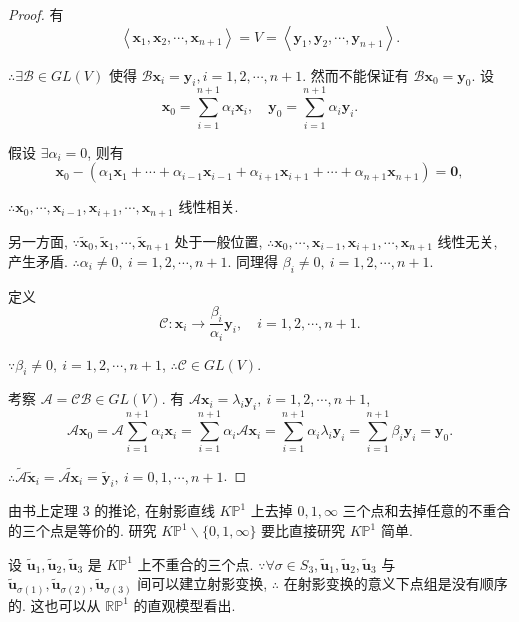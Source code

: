 \documentclass[color=black,device=normal,lang=cn,mode=geye]{elegantnote}
\begin{document}
\begin{proof}
    有
    \[\left<\boldsymbol{x}_1,\boldsymbol{x}_2,\cdots,\boldsymbol{x}_{n+1}\right>=V=\left<\boldsymbol{y}_1,\boldsymbol{y}_2,\cdots,\boldsymbol{y}_{n+1}\right>.\]

    $\therefore\exists\mathcal{B}\in GL (V)$ 使得 $\mathcal{B}\boldsymbol{x}_i=\boldsymbol{y}_i,i=1,2,\cdots,n+1$. 然而不能保证有 $\mathcal{B}\boldsymbol{x}_0=\boldsymbol{y}_0$. 设
    \[\boldsymbol{x}_0=\sum\limits_{i=1}^{n+1}\alpha_i\boldsymbol{x}_i,\quad\boldsymbol{y}_0=\sum\limits_{i=1}^{n+1}\alpha_i\boldsymbol{y}_i.\]

    假设 $\exists\alpha_i=0$, 则有
    \[\boldsymbol{x}_0-(\alpha_1\boldsymbol{x}_1+\cdots+\alpha_{i-1}\boldsymbol{x}_{i-1}+\alpha_{i+1}\boldsymbol{x}_{i+1}+\cdots+\alpha_{n+1}\boldsymbol{x}_{n+1})=\boldsymbol{0},\]

    $\therefore\boldsymbol{x}_0,\cdots,\boldsymbol{x}_{i-1},\boldsymbol{x}_{i+1},\cdots,\boldsymbol{x}_{n+1}$ 线性相关.
    
    另一方面, $\because\tilde{\boldsymbol{x}}_0,\tilde{\boldsymbol{x}}_1,\cdots,\tilde{\boldsymbol{x}}_{n+1}$ 处于一般位置, $\therefore\boldsymbol{x}_0,\cdots,\boldsymbol{x}_{i-1},\boldsymbol{x}_{i+1},\cdots,\boldsymbol{x}_{n+1}$ 线性无关, 产生矛盾. $\therefore\alpha_i\neq0,\ i=1,2,\cdots,n+1$. 同理得 $\beta_i\neq0,\ i=1,2,\cdots,n+1$.
    
    定义
    \[\mathcal{C}:\boldsymbol{x}_i\to\dfrac{\beta_i}{\alpha_i}\boldsymbol{y}_i,\quad i=1,2,\cdots,n+1.\]

    $\because\beta_i\neq0,\ i=1,2,\cdots,n+1$, $\therefore\mathcal{C}\in GL (V)$.

    考察 $\mathcal{A}=\mathcal{CB}\in GL (V)$. 有 $\mathcal{A}\boldsymbol{x}_i=\lambda_i\boldsymbol{y}_i,\ i=1,2,\cdots,n+1$,
    \[\mathcal{A}\boldsymbol{x}_0=\mathcal{A}\sum\limits_{i=1}^{n+1}\alpha_i\boldsymbol{x}_i=\sum\limits_{i=1}^{n+1}\alpha_i\mathcal{A}\boldsymbol{x}_i=\sum\limits_{i=1}^{n+1}\alpha_i\lambda_i\boldsymbol{y}_i=\sum\limits_{i=1}^{n+1}\beta_i\boldsymbol{y}_i=\boldsymbol{y}_0.\]

    $\therefore\widetilde{\mathcal{A}}\tilde{\boldsymbol{x}}_i=\widetilde{\mathcal{A}\boldsymbol{x}_i}=\tilde{\boldsymbol{y}}_i,\ i=0,1,\cdots,n+1$.
\end{proof}
由书上定理 3 的推论, 在射影直线 $K\mathbb{P}^1$ 上去掉 $0,1,\infty$ 三个点和去掉任意的不重合的三个点是等价的. 研究 $K\mathbb{P}^1\backslash\{0,1,\infty\}$ 要比直接研究 $K\mathbb{P}^1$ 简单.

设 $\tilde{\boldsymbol{u}}_1,\tilde{\boldsymbol{u}}_2,\tilde{\boldsymbol{u}}_3$ 是 $K\mathbb{P}^1$ 上不重合的三个点. $\because\forall\sigma\in S_3,\tilde{\boldsymbol{u}}_1,\tilde{\boldsymbol{u}}_2,\tilde{\boldsymbol{u}}_3$ 与 $\tilde{\boldsymbol{u}}_{\sigma(1)},\tilde{\boldsymbol{u}}_{\sigma(2)},\tilde{\boldsymbol{u}}_{\sigma(3)}$ 间可以建立射影变换, $\therefore$ 在射影变换的意义下点组是没有顺序的. 这也可以从 $\mathbb{RP}^1$ 的直观模型看出.
\end{document}
